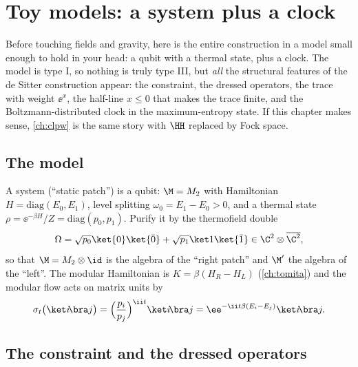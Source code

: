 \chapter{Toy models: a system plus a clock}\label{ch:toy_clock}

\begin{physmotiv}
Before touching fields and gravity, here is the entire construction in a model small enough to hold in your head: a qubit with a thermal state, plus a clock. The model is type I, so nothing is truly type III, but \emph{all} the structural features of the de Sitter construction appear: the constraint, the dressed operators, the trace with weight $\ee^{x}$, the half-line $x\le0$ that makes the trace finite, and the Boltzmann-distributed clock in the maximum-entropy state. If this chapter makes sense, \cref{ch:clpw} is the same story with $\HH$ replaced by Fock space.
\end{physmotiv}

\section{The model}

A system (``static patch'') is a qubit: $\M=M_2$ with Hamiltonian $H=\mathrm{diag}(E_0,E_1)$, level splitting $\omega_0=E_1-E_0>0$, and a thermal state $\rho=\ee^{-\beta H}/Z=\mathrm{diag}(p_0,p_1)$. Purify it by the thermofield double
\begin{equation}
\Omega=\sqrt{p_0}\ket{0}\ket{\bar0}+\sqrt{p_1}\ket1\ket{\bar1}\in\C^2\otimes\overline{\C^2},
\end{equation}
so that $\M=M_2\otimes\id$ is the algebra of the ``right patch'' and $\M'$ the algebra of the ``left''. The modular Hamiltonian is $K=\beta(H_R-H_L)$ (\cref{ch:tomita}) and the modular flow acts on matrix units by
\begin{equation}
\sigma_t\big(\ket i\!\bra j\big)=\Big(\frac{p_i}{p_j}\Big)^{\ii t}\ket i\!\bra j=\ee^{-\ii t\beta(E_i-E_j)}\ket i\!\bra j.
\end{equation}

\section{The constraint and the dressed operators}

